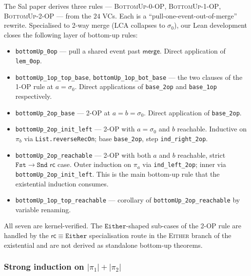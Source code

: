 \documentclass[11pt,a4paper]{article}
\theoremstyle{definition}
\theoremstyle{remark}
\newcommand{\mmerge}{\mathsf{merge}}
\newcommand{\mrc}{\mathsf{rc}}
\newcommand{\Either}{\mathtt{Either}}
\newcommand{\Fst}{\mathtt{Fst}}
\newcommand{\Snd}{\mathtt{Snd}}
\newcommand{\init}{\sigma_0}
\begin{document}
The Sal paper derives three rules ---
\textsc{BottomUp-0-OP}, \textsc{BottomUp-1-OP},
\textsc{BottomUp-2-OP} --- from the $24$ VCs. Each is a
``pull-one-event-out-of-merge'' rewrite. Specialised to 2-way merge
(LCA collapses to $\init$), our Lean development closes the
following layer of bottom-up rules:
\begin{itemize}[leftmargin=*]
  \item \texttt{bottomUp\_0op} --- pull a shared event past
    $\mmerge$. Direct application of \texttt{lem\_0op}.
  \item \texttt{bottomUp\_1op\_top\_base},
    \texttt{bottomUp\_1op\_bot\_base} --- the two clauses of the
    1-OP rule at $a = \init$. Direct applications of
    \texttt{base\_2op} and \texttt{base\_1op} respectively.
  \item \texttt{bottomUp\_2op\_base} --- 2-OP at $a = b = \init$.
    Direct application of \texttt{base\_2op}.
  \item \texttt{bottomUp\_2op\_init\_left} --- 2-OP with
    $a = \init$ and $b$ reachable. Inductive on $\pi_b$ via
    \texttt{List.reverseRecOn}; base \texttt{base\_2op}, step
    \texttt{ind\_right\_2op}.
  \item \texttt{bottomUp\_2op\_reachable} --- 2-OP with both $a$
    and $b$ reachable, strict $\Fst\!\to\!\Snd$ $\mrc$ case. Outer
    induction on $\pi_a$ via \texttt{ind\_left\_2op}; inner via
    \texttt{bottomUp\_2op\_init\_left}. This is the main
    bottom-up rule that the existential induction consumes.
  \item \texttt{bottomUp\_1op\_top\_reachable} --- corollary of
    \texttt{bottomUp\_2op\_reachable} by variable renaming.
\end{itemize}
All seven are kernel-verified. The $\Either$-shaped sub-cases of
the 2-OP rule are handled by the
$\mrc \equiv \Either$ specialisation route in the
\textsc{Either} branch of the existential and are not derived as
standalone bottom-up theorems.

\subsubsection{Strong induction on $|\pi_1| + |\pi_2|$}
\label{sec:merge-induction}
\end{document}
